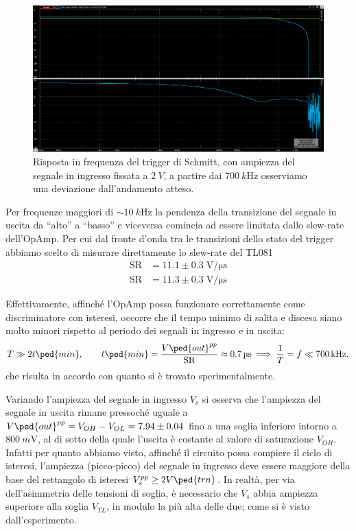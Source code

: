 \documentclass[10pt, a4paper, italian]{article}
\begin{document}
\begin{figure}[htbp]
\centering
\includegraphics[scale=0.335]{bodeschmitt2V100Hz5MHz}
\caption{Risposta in frequenza del trigger di Schmitt, con ampiezza del segnale
in ingresso fissata a $\SI{2}{V}$, a partire dai $\SI{700}{k\Hz}$ osserviamo
una deviazione dall'andamento atteso.}
\end{figure}

Per frequenze maggiori di $\sim \SI{10}{k\Hz}$ la pendenza della transizione
del segnale in uscita da ``alto'' a ``basso'' e viceversa comincia ad essere
limitata dallo slew-rate dell'OpAmp.
Per cui dal fronte d'onda tra le transizioni dello stato del trigger abbiamo
scelto di misurare direttamente lo slew-rate del TL081
\begin{align*}
\mathrm{SR} &= 11.1 \pm 0.3 \; \si{\V/\micro\s} \\
\mathrm{SR} &= 11.3 \pm 0.3 \; \si{\V/\micro\s}
\end{align*}

Effettivamente, affinché l'OpAmp possa funzionare correttamente come
discriminatore con isteresi, occorre che il tempo minimo di salita e discesa
siano molto minori rispetto al periodo dei segnali in ingresso e in uscita:
\begin{equation}\label{eq: slewlim}
T \gg 2 t\ped{min}, \qquad t\ped{min} =
\frac{V\ped{out}^{pp}}{\mathrm{SR}} \approx \SI{0.7}{\micro\s}
\implies \frac{1}{T} = f \ll \SI{700}{k\Hz}.
\end{equation}
che risulta in accordo con quanto si è trovato sperimentalmente.

Variando l'ampiezza del segnale in ingresso $V_s$ si osserva che l'ampiezza del
segnale in uscita rimane pressoché uguale a $V\ped{out}^{pp} = V_{OH} - V_{OL}
= 7.94 \pm 0.04$ fino a una soglia inferiore intorno a $\SI{800}{m\V}$, al di
sotto della quale l'uscita è costante al valore di saturazione $V_{OH}$.
Infatti per quanto abbiamo visto, affinché il circuito possa compiere il ciclo
di isteresi, l'ampiezza (picco-picco) del segnale in ingresso deve essere
maggiore della base del rettangolo di isteresi $V_s^{pp} \geq 2 V\ped{trn}$.
In realtà, per via dell'asimmetria delle tensioni di soglia, è necessario
che $V_s$ abbia ampiezza superiore alla soglia $V_{TL}$, in modulo la
più alta delle due; come si è visto dall'esperimento.
\end{document}
